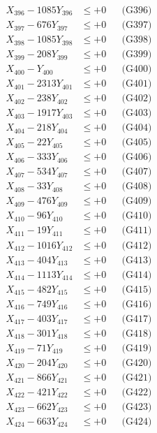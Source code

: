 \documentclass[a4paper,10pt]{article}
\begin{document}
{\begin{align}
X_{396} - 1085Y_{396} &\leq +0 && \text{(G396)} \\
X_{397} - 676Y_{397} &\leq +0 && \text{(G397)} \\
X_{398} - 1085Y_{398} &\leq +0 && \text{(G398)} \\
X_{399} - 208Y_{399} &\leq +0 && \text{(G399)} \\
X_{400} - Y_{400} &\leq +0 && \text{(G400)} \\
\allowbreak
X_{401} - 2313Y_{401} &\leq +0 && \text{(G401)} \\
X_{402} - 238Y_{402} &\leq +0 && \text{(G402)} \\
X_{403} - 1917Y_{403} &\leq +0 && \text{(G403)} \\
X_{404} - 218Y_{404} &\leq +0 && \text{(G404)} \\
X_{405} - 22Y_{405} &\leq +0 && \text{(G405)} \\
X_{406} - 333Y_{406} &\leq +0 && \text{(G406)} \\
X_{407} - 534Y_{407} &\leq +0 && \text{(G407)} \\
X_{408} - 33Y_{408} &\leq +0 && \text{(G408)} \\
X_{409} - 476Y_{409} &\leq +0 && \text{(G409)} \\
X_{410} - 96Y_{410} &\leq +0 && \text{(G410)} \\
\allowbreak
X_{411} - 19Y_{411} &\leq +0 && \text{(G411)} \\
X_{412} - 1016Y_{412} &\leq +0 && \text{(G412)} \\
X_{413} - 404Y_{413} &\leq +0 && \text{(G413)} \\
X_{414} - 1113Y_{414} &\leq +0 && \text{(G414)} \\
X_{415} - 482Y_{415} &\leq +0 && \text{(G415)} \\
X_{416} - 749Y_{416} &\leq +0 && \text{(G416)} \\
X_{417} - 403Y_{417} &\leq +0 && \text{(G417)} \\
X_{418} - 301Y_{418} &\leq +0 && \text{(G418)} \\
X_{419} - 71Y_{419} &\leq +0 && \text{(G419)} \\
X_{420} - 204Y_{420} &\leq +0 && \text{(G420)} \\
\allowbreak
X_{421} - 866Y_{421} &\leq +0 && \text{(G421)} \\
X_{422} - 421Y_{422} &\leq +0 && \text{(G422)} \\
X_{423} - 662Y_{423} &\leq +0 && \text{(G423)} \\
X_{424} - 663Y_{424} &\leq +0 && \text{(G424)} \\

\end{align}}
\end{document}
